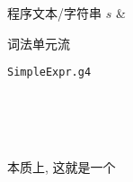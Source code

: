 
\begin{frame}{}
  \begin{center}
     程序文本/字符串 $s$ \& 

    \vspace{0.50cm}

    \vspace{0.30cm}
     词法单元流
  \end{center}
\end{frame}

\begin{frame}{}
  \begin{center}
    \texttt{SimpleExpr.g4}
  \end{center}
\end{frame}




\begin{frame}{}

  \pause
  \vspace{0.20cm}
  \begin{center}
    \intkw \quad \ws \quad \red{\mainkw/\id} \quad \blue{\lp} \quad \voidkw \quad \blue{\rp} \quad \ws \\[8pt]
    \lb \quad \ws \\[8pt]
    \ws \quad \id \quad \lp \quad \literal \quad \rp \quad \semicolon\quad \ws \\[8pt]
    \rb
  \end{center}

  \pause
  \vspace{0.20cm}
  \begin{center}
    本质上, 这就是一个
  \end{center}
\end{frame}

